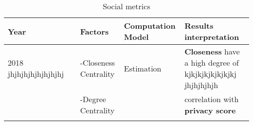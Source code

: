 \onecolumn
\pagestyle{empty}
\setlength{\hoffset}{-0.5in}

\begin{longtable}{lllll}
	\textbf{Year}  &                                                & \textbf{Factors}                 & \textbf{Computation Model}       & \textbf{Results interpretation}                               \\\hline
	2018  jhjhjhjhjhjhjhjhj		   & \cite{alemany_estimation_2018}                 & -Closeness Centrality            & Estimation                       & \textbf{Closeness} have a high degree of   kjkjkjkjkjkjkjkj jhjhjhjhjh                   \\
	\    		   &                                                & -Degree Centrality               &                                  & correlation with \textbf{privacy score}                       \\\hline
\caption{Social metrics}
\end{longtable}

\setlength{\hoffset}{0in}
